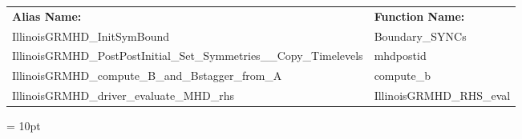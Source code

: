 \documentclass{article}
\begin{document}
\hspace{5mm}

 \begin{tabular*}{160mm}{ll} 

{\bf Alias Name:} ~~~~~~~ & {\bf Function Name:} \\ 
IllinoisGRMHD\_InitSymBound & Boundary\_SYNCs \\ 
IllinoisGRMHD\_PostPostInitial\_Set\_Symmetries\_\_Copy\_Timelevels & mhdpostid \\ 
IllinoisGRMHD\_compute\_B\_and\_Bstagger\_from\_A & compute\_b \\ 
IllinoisGRMHD\_driver\_evaluate\_MHD\_rhs & IllinoisGRMHD\_RHS\_eval \\ 
\end{tabular*} 



\vspace{5mm}\parskip = 10pt 
\end{document}
